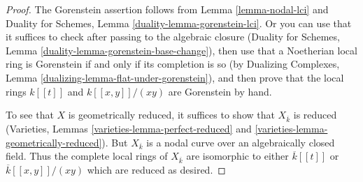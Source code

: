 \documentclass[10pt,a4paper]{amsart}
\theoremstyle{plain}
\theoremstyle{definition}
\theoremstyle{remark}
\numberwithin{equation}{subsection}
\begin{document}
\begin{proof}
The Gorenstein assertion follows from Lemma \ref{lemma-nodal-lci}
and Duality for Schemes, Lemma \ref{duality-lemma-gorenstein-lci}.
Or you can use that it suffices to check after passing to the
algebraic closure (Duality for Schemes, Lemma
\ref{duality-lemma-gorenstein-base-change}), then use that
a Noetherian local ring is Gorenstein if and only if its
completion is so (by Dualizing Complexes, Lemma
\ref{dualizing-lemma-flat-under-gorenstein}), and
then prove that the local rings $k[[t]]$ and $k[[x, y]]/(xy)$
are Gorenstein by hand.

\medskip\noindent
To see that $X$ is geometrically reduced, it suffices to show that
$X_{\overline{k}}$ is reduced (Varieties, Lemmas
\ref{varieties-lemma-perfect-reduced} and
\ref{varieties-lemma-geometrically-reduced}).
But $X_{\overline{k}}$ is a nodal curve over an
algebraically closed field. Thus the complete local rings
of $X_{\overline{k}}$ are isomorphic to either
$\overline{k}[[t]]$ or $\overline{k}[[x, y]]/(xy)$
which are reduced as desired.
\end{proof}
\end{document}
